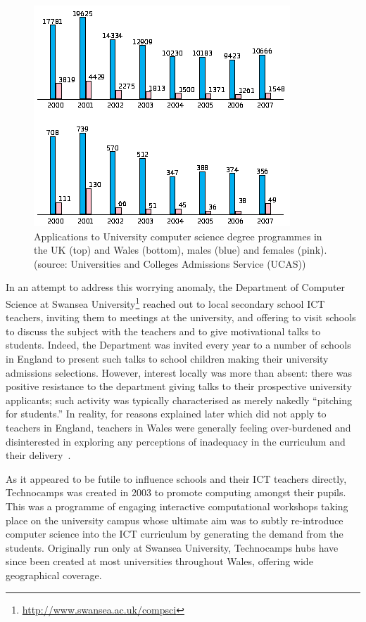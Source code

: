 \begin{figure}%
  \centering
  \includegraphics[width=0.9\columnwidth]{images/numbers.png}
  \caption{Applications to University computer science degree programmes
           in the UK (top) and Wales (bottom), males (blue) and females (pink).
           (source: Universities and Colleges Admissions Service
           (UCAS))}
  \label{fig:numbers}
\end{figure}

In an attempt to address this worrying anomaly, the Department of
Computer Science at
Swansea University\footnote{\url{http://www.swansea.ac.uk/compsci}} reached out
to local secondary school ICT teachers, inviting them to meetings at
the university, and offering to visit schools to discuss the subject
with the teachers and to give motivational talks to students. Indeed,
the Department was invited every year to a number of schools in
England to present such talks to school children making their
university admissions selections.  However, interest locally was more
than absent: there was positive resistance to the department giving
talks to their prospective university applicants; such activity was
typically characterised as merely nakedly ``pitching for students.''
In reality, for reasons explained later which did not apply to
teachers in England, teachers in Wales were generally feeling
over-burdened and disinterested in exploring any perceptions of
inadequacy in the curriculum and their
delivery~\cite{crick+sentance:2011,boyle-et-al:2012,brown-et-al-toce2014}.

As it appeared to be futile to influence schools and their ICT
teachers directly, Technocamps was created in 2003 to promote
computing amongst their pupils.  This was a programme of engaging
interactive computational workshops taking place on the university
campus whose ultimate aim was to subtly re-introduce computer science
into the ICT curriculum by generating the demand from the students.
Originally run only at Swansea University, Technocamps hubs have since
been created at most universities throughout Wales, offering wide
geographical coverage.


